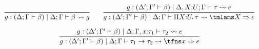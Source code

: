   \centering
{}
\newcommand{\ghole}{%
  \Delta^\prime ; \Gamma^\prime \mid \tau^\prime
}
%
\newcommand{\conc}[2]{%
  \unrolljudg{\goalwith {\goalctx{^\prime}} \beta}{\goalctx{}}{#1}{#2}
}
\newcommand{\prem}[2]{%
  \unrolljudg{\goalwith {\goalctx{^\prime}} \beta}{#1}{e}{#2}
}
%
\[
  \begin{array}{c}
  \infer{%
    \unrolljudg{\goalwith{\goalctx{}} \beta}{\goalctx{}}{g}{\beta}
  }{
  }
  \qquad
  \infer{%
    \conc{\tmlams X \bto e}{\Pi X{:}U.\, \tau}
  }{
    \prem{\Delta, X{:}U; \Gamma}{\tau}
  }
  \\[1em]
  \infer{%
    \conc{\tfns x \bto e}{\tau_1 \to \tau_2}
  }{
    \prem{\Delta; \Gamma, x{:}\tau_1}{\tau_2}
  }
  \end{array}
\]

